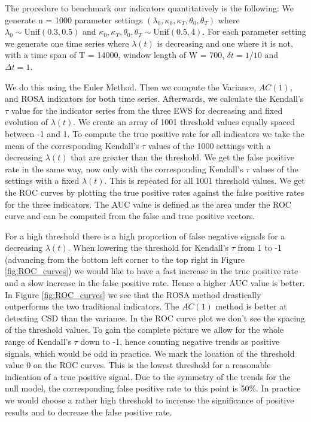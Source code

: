 \documentclass[%
thesis=student,%
coverpage=false,%
titlepage=false,%
headmarks=true, %
english,%
font=libertine, %
math=newpxtx, %
BCOR=5mm,%
coverBCOR=11mm%
]{tumbook}
\begin{document}
The procedure to benchmark our indicators quantitatively is the following:
We generate n = 1000 parameter settings $(\lambda_{0},\kappa_{0},\kappa_{T},\theta_{0},\theta_{T})$ where $\lambda_{0} \sim \text{Unif}(0.3,0.5)$ and $\kappa_{0},\kappa_{T},\theta_{0},\theta_{T} \sim \text{Unif}(0.5,4)$. For each parameter setting we generate one time series where $\lambda(t)$ is decreasing and one where it is not, with a time span of T = 14000, window length of W = 700, $\delta t = 1/10$ and $\Delta t = 1$.


 We do this using the Euler Method. Then we compute the Variance, $AC(1)$, and ROSA indicators for both time series. Afterwards, we calculate the Kendall's $\tau$ value for the indicator series from the three EWS for decreasing and fixed evolution of $\lambda(t)$. We create an array of 1001 threshold values equally spaced between -1 and 1. To compute the true positive rate for all indicators we take the mean of the corresponding Kendall's $\tau$ values of the 1000 settings with a decreasing $\lambda(t)$ that are greater than the threshold. We get the false positive rate in the same way, now only with the corresponding Kendall's $\tau$ values of the settings with a fixed $\lambda(t)$. This is repeated for all 1001 threshold values. We get the ROC curves by plotting the true positive rates against the false positive rates for the three indicators.
The AUC value is defined as the area under the ROC curve and can be computed from the false and true positive vectors. 

For a high threshold there is a high proportion of false negative signals for a decreasing $\lambda(t)$. When lowering the threshold for Kendall's $\tau$ from 1 to -1 (advancing from the bottom left corner to the top right in Figure \ref{fig:ROC_curves}) we would like to have a fast increase in the true positive rate and a slow increase in the false positive rate. Hence a higher AUC value is better. In Figure \ref{fig:ROC_curves} we see that the ROSA method drastically outperforms the two traditional indicators. The $AC(1)$ method is better at detecting CSD than the variance.  
In the ROC curve plot we don't see the spacing of the threshold values. To gain the complete picture we allow for the whole range of Kendall's $\tau$ down to -1, hence counting negative trends as positive signals, which would be odd in practice. We mark the location of the threshold value 0 on the ROC curves. This is the lowest threshold for a reasonable indication of a true positive signal. Due to the symmetry of the trends for the null model, the corresponding false positive rate to this point is 50\%. In practice we would choose a rather high threshold to increase the significance of positive results and to decrease the false positive rate.
\end{document}
